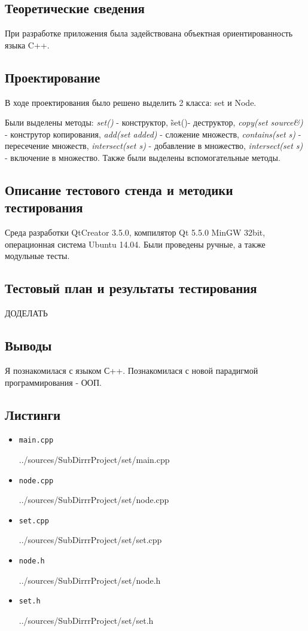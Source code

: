 \documentclass[12pt,a4paper]{report}
\begin{document}
\subsection{Теоретические сведения}
\hspace{\parindent}
При разработке приложения была задействована объектная ориентированность языка C++. 

\subsection{Проектирование}
\hspace{\parindent}
В ходе проектирования было решено выделить 2 класса: set и Node.

\hspace{\parindent}
Были выделены методы: \textit{set()} - конструктор, \~set()- деструктор, \textit{copy(set source\&)} - конструтор копирования, \textit{add(set added)} - сложение множеств, \textit{contains(set s)} - пересечение множеств, \textit{intersect(set s)} - добавление в множество, \textit{intersect(set s)} - включение в множество.
Также были выделены вспомогательные методы.


\subsection{Описание тестового стенда и методики тестирования}
Среда разработки QtCreator 3.5.0, компилятор Qt 5.5.0 MinGW 32bit, операционная система Ubuntu 14.04. Были проведены ручные, а также модульные тесты.
\subsection{Тестовый план и результаты тестирования}
ДОДЕЛАТЬ
\subsection{Выводы}
\hspace{\parindent}
Я познакомилася с языком С++. Познакомилася с новой парадигмой программирования - ООП.
\subsection*{Листинги}
\begin{itemize}
\item[] \verb-main.cpp-

{../sources/SubDirrrProject/set/main.cpp}
\item[] \verb-node.cpp-

{../sources/SubDirrrProject/set/node.cpp}
\item[] \verb-set.cpp-

{../sources/SubDirrrProject/set/set.cpp}
\item[] \verb-node.h-

{../sources/SubDirrrProject/set/node.h}
\item[] \verb-set.h-

{../sources/SubDirrrProject/set/set.h}
\end{itemize}
\end{document}
